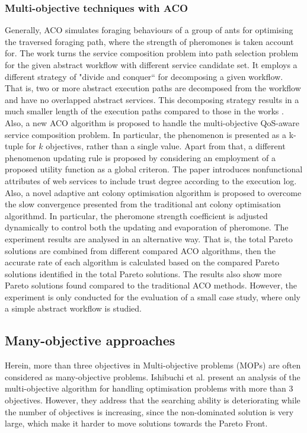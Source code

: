 \subsubsection{Multi-objective techniques with ACO} Generally, ACO simulates foraging behaviours of a group of ants for optimising the traversed foraging path, where the strength of pheromones is taken account for. The work \cite{zhang2010qos} turns the service composition problem into path selection problem for the given abstract workflow with different service candidate set.  It employs a different strategy of "divide and conquer`` for decomposing a given workflow. That is,  two or more abstract execution paths are decomposed from the workflow and have no overlapped abstract services. This decomposing strategy results in a much smaller length of the execution paths compared to those in the works \cite{yu2007efficient}.  Also, a new ACO algorithm is proposed to handle the multi-objective QoS-aware service composition problem. In particular,  the phenomenon is presented as a k-tuple for $k$ objectives, rather than a single value. Apart from that, a different phenomenon updating rule is proposed by considering an employment of a proposed utility function as a global criteron. The paper \cite{wang2014novel} introduces nonfunctional attributes of web services to include trust degree according to the execution log. Also, a novel adaptive ant colony optimisation algorithm is proposed to overcome the slow convergence presented from the traditional ant colony optimisation algorithmd. In particular, the pheromone strength coefficient is adjusted dynamically to control both the updating and evaporation of pheromone. The experiment results are analysed in an alternative way. That is, the total Pareto solutions are combined from different compared ACO algorithms, then the accurate rate of each algorithm is calculated based on the compared Pareto solutions identified in the total Pareto solutions. The results also show more Pareto solutions found compared to the traditional ACO methods. However, the experiment is only conducted for the evaluation of a small case study, where only a simple abstract workflow is studied.

\subsection{Many-objective approaches}\label{ManyObjective}

Herein, more than three objectives in Multi-objective problems (MOPs) are often considered as many-objective problems. Ishibuchi et al. \cite{ishibuchi2008evolutionary} present an analysis of the multi-objective algorithm for handling optimisation problems with more than 3 objectives. However, they address that the searching ability is deteriorating while the number of objectives is increasing, since the non-dominated solution is very large, which make it harder to move solutions towards the Pareto Front.


